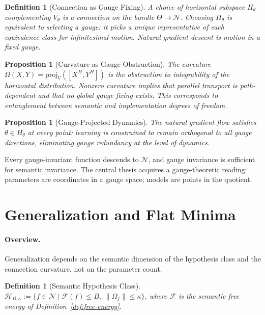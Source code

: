 \documentclass[twocolumn,10pt]{article}
\theoremstyle{thmstyle}
\newtheorem{proposition}[theorem]{Proposition}
\theoremstyle{defstyle}
\newtheorem{definition}[theorem]{Definition}
\begin{document}
\begin{definition}[Connection as Gauge Fixing]
A choice of horizontal subspace $H_\theta$ complementing $V_\theta$ is
a \emph{connection} on the bundle $\Theta \to \mathcal{N}$. Choosing
$H_\theta$ is equivalent to selecting a gauge: it picks a unique
representative of each equivalence class for infinitesimal motion.
Natural gradient descent is motion in a fixed gauge.
\end{definition}

\begin{proposition}[Curvature as Gauge Obstruction]
The curvature $\Omega(X,Y) = \mathrm{proj}_V([X^H,Y^H])$ is the
obstruction to integrability of the horizontal distribution. Nonzero
curvature implies that parallel transport is path-dependent and that
no global gauge fixing exists. This corresponds to entanglement between
semantic and implementation degrees of freedom.
\end{proposition}

\begin{proposition}[Gauge-Projected Dynamics]
The natural gradient flow satisfies $\dot\theta \in H_\theta$ at every
point: learning is constrained to remain orthogonal to all gauge
directions, eliminating gauge redundancy at the level of dynamics.
\end{proposition}

Every gauge-invariant function descends to $\mathcal{N}$, and gauge
invariance is sufficient for semantic invariance. The central thesis
acquires a gauge-theoretic reading: parameters are coordinates in a
gauge space; models are points in the quotient.

\section{Generalization and Flat Minima}
\label{sec:generalization}

\paragraph{Overview.}
Generalization depends on the semantic dimension of the hypothesis class
and the connection curvature, not on the parameter count.

\begin{definition}[Semantic Hypothesis Class]
$\mathcal{H}_{B,\kappa} := \{f \in \mathcal{N} \mid \mathcal{F}(f)
\leq B,\; \|\Omega_f\| \leq \kappa\}$, where $\mathcal{F}$ is the
semantic free energy of Definition~\ref{def:free-energy}.
\end{definition}
\end{document}
